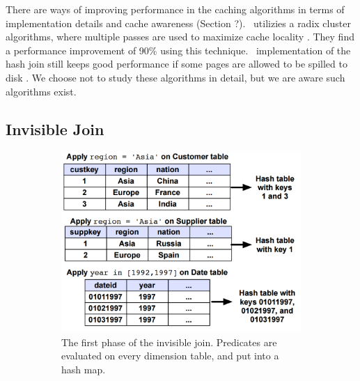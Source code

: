 There are ways of improving performance in the caching algorithms in terms of implementation details and cache awareness (Section ?). \monetdb~utilizies a radix cluster algorithms, where multiple passes are used to maximize cache locality \cite{Boncz2002-yj}. They find a performance improvement of 90\% using this technique. \mssql~implementation of the hash join still keeps good performance if some pages are allowed to be spilled to disk \cite{Larson2013-mc}. We choose not to study these algorithms in detail, but we are aware such algorithms exist.

\subsection{Invisible Join}
\label{sub:Invisible Join}
\begin{figure}
  \centering
  \begin{subfigure}{0.45\textwidth}
    \includegraphics[width=\textwidth]{img/invisible-join-1.png}
    \caption{The first phase of the invisible join. Predicates are evaluated on every dimension table, and put into a hash map.}
    \label{fig:invisible-join-1} 
  \end{subfigure}
  \begin{subfigure}{0.45\textwidth}

\end{subfigure}
\end{figure}

